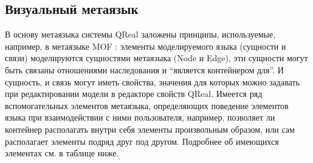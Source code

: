 \subsection{Визуальный метаязык}
В основу метаязыка системы QReal заложены принципы, используемые, например, в метаязыке MOF 
: элементы моделируемого языка (сущности и связи) моделируются сущностями метаязыка 
(Node и Edge), эти сущности могут быть связаны отношениями наследования и "`является контейнером для"'. 
И сущность, и связь могут иметь свойства, значения для которых можно задавать при 
редактировании модели в редакторе свойств QReal. Имеется ряд вспомогательных элементов 
метаязыка, определяющих поведение элементов языка при взаимодействии с ними пользователя, 
например, позволяет ли контейнер располагать внутри себя элементы произвольным образом, 
или сам располагает элементы подряд друг под другом. Подробнее об имеющихся элементах 
см. в таблице ниже.


